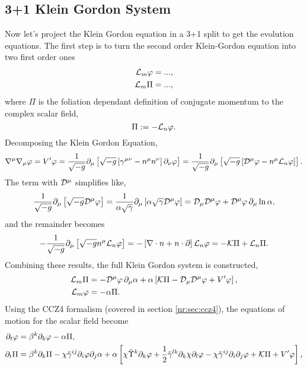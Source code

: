 \subsection{3+1 Klein Gordon System} \label{boson:sec:3+1kgeqn}
Now let's project the Klein Gordon equation in a 3+1 split to get the evolution equations. The first step is to turn the second order Klein-Gordon equation into two first order ones
\begin{align} 
\mathcal{L}_m \varphi = ... ,\\
\mathcal{L}_m \Pi = ... ,
\end{align}
where $\Pi$ is the foliation dependant definition of conjugate momentum to the complex scalar field,
\begin{equation} \Pi:= -\mathcal{L}_n \varphi. \label{boson:eq:Pidef}\end{equation}
Decomposing the Klein Gordon Equation,
\begin{equation} 
\nabla^\mu \nabla_\mu \varphi = V' \varphi = \frac{1}{\sqrt{-g}} \partial_\mu \left[ \sqrt{-g}\left[\gamma^{\mu\nu}-n^\mu n^\nu\right]\partial_\nu \varphi\right] = \frac{1}{\sqrt{-g}} \partial_\mu \left[ \sqrt{-g}\left[\mathcal{D}^\mu\varphi-n^\mu \mathcal{L}_n\varphi\right]\right]. 
\end{equation}
The term with $\mathcal{D}^\mu$ simplifies like,
\begin{equation}\frac{1}{\sqrt{-g}} \partial_\mu \left[ \sqrt{-g}\mathcal{D}^\mu\varphi\right] =  \frac{1}{\alpha\sqrt{\gamma}} \partial_\mu \left[\alpha\sqrt{\gamma}\mathcal{D}^\mu\varphi\right]  = \mathcal{D}_\mu \mathcal{D}^\mu \varphi + \mathcal{D}^\mu \varphi \,\partial_\mu \ln \alpha,\end{equation}
and the remainder becomes
\begin{equation}-\frac{1}{\sqrt{-g}} \partial_\mu \left[ \sqrt{-g}n^\mu \mathcal{L}_n\varphi\right] = -\left[\nabla \cdot n + n\cdot \partial\right]\mathcal{L}_n\varphi = -\mathcal{K}\Pi + \mathcal{L}_n \Pi.\end{equation}
Combining these results, the full Klein Gordon system is constructed,
\begin{align}
 \mathcal{L}_m \Pi &= - \mathcal{D}^\mu\varphi\,\partial_\mu \alpha+\alpha\left[\mathcal{K}\Pi - \mathcal{D}_\mu \mathcal{D}^\mu \varphi  + V'\varphi\right], \\
 \mathcal{L}_m \varphi &= - \alpha\Pi.\end{align}
Using the CCZ4 formalism (covered in section \ref{nr:sec:ccz4}), the equations of motion for the scalar field become
\begin{align}
\partial_t \varphi &= \beta^k\partial_k \varphi - \alpha\Pi ,\label{boson:eq:ccz4kg1}\\
\partial_t \Pi &= \beta^k\partial_k\Pi -\chi \tilde{\gamma}^{ij}\partial_i \varphi \partial_j \alpha + \alpha \left[ \chi \tilde{\Upsilon}^k\partial_k \varphi+\frac{1}{2} \tilde{\gamma}^{lk}\partial_k\chi\partial_l\varphi  - \chi \tilde{\gamma}^{ij}\partial_i \partial_j \varphi + \mathcal{K} \Pi + V' \varphi \right],\label{boson:eq:ccz4kg2}
\end{align}
